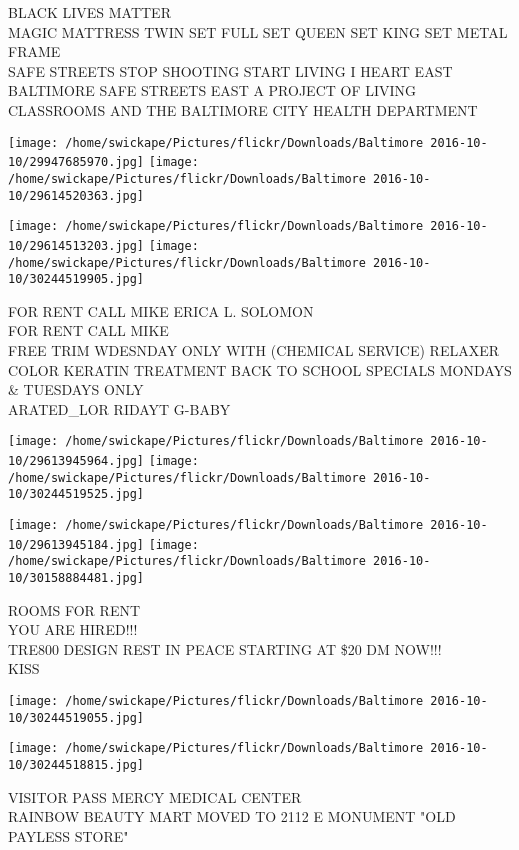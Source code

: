 \documentclass[10pt,letterpaper]{article}
\begin{document}
BLACK LIVES MATTER\\
MAGIC MATTRESS TWIN SET FULL SET QUEEN SET KING SET METAL FRAME\\
SAFE STREETS STOP SHOOTING START LIVING I HEART EAST BALTIMORE SAFE STREETS EAST A PROJECT OF LIVING CLASSROOMS AND THE BALTIMORE CITY HEALTH DEPARTMENT
\pagebreak

\texttt{[image: /home/swickape/Pictures/flickr/Downloads/Baltimore 2016-10-10/29947685970.jpg]}
\texttt{[image: /home/swickape/Pictures/flickr/Downloads/Baltimore 2016-10-10/29614520363.jpg]}

\texttt{[image: /home/swickape/Pictures/flickr/Downloads/Baltimore 2016-10-10/29614513203.jpg]}
\texttt{[image: /home/swickape/Pictures/flickr/Downloads/Baltimore 2016-10-10/30244519905.jpg]}

FOR RENT CALL MIKE ERICA L. SOLOMON\\
FOR RENT CALL MIKE\\
FREE TRIM WDESNDAY ONLY WITH (CHEMICAL SERVICE) RELAXER COLOR KERATIN TREATMENT BACK TO SCHOOL SPECIALS MONDAYS \& TUESDAYS ONLY\\
ARATED\_LOR RIDAYT G{-}BABY
\pagebreak

\texttt{[image: /home/swickape/Pictures/flickr/Downloads/Baltimore 2016-10-10/29613945964.jpg]}
\texttt{[image: /home/swickape/Pictures/flickr/Downloads/Baltimore 2016-10-10/30244519525.jpg]}

\texttt{[image: /home/swickape/Pictures/flickr/Downloads/Baltimore 2016-10-10/29613945184.jpg]}
\texttt{[image: /home/swickape/Pictures/flickr/Downloads/Baltimore 2016-10-10/30158884481.jpg]}

ROOMS FOR RENT\\
YOU ARE HIRED!!!\\
TRE800 DESIGN REST IN PEACE STARTING AT \$20 DM NOW!!!\\
KISS
\pagebreak

\texttt{[image: /home/swickape/Pictures/flickr/Downloads/Baltimore 2016-10-10/30244519055.jpg]}

\vspace{0.25in}
\texttt{[image: /home/swickape/Pictures/flickr/Downloads/Baltimore 2016-10-10/30244518815.jpg]}

VISITOR PASS MERCY MEDICAL CENTER\\
RAINBOW BEAUTY MART MOVED TO 2112 E MONUMENT "OLD PAYLESS STORE"
\pagebreak
\end{document}
